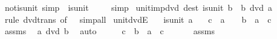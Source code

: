 \begin{isabellebody}
\isamarkupfalse%
\ not{\isacharunderscore}{\kern0pt}is{\isacharunderscore}{\kern0pt}unit{\isacharunderscore}{\kern0pt}{}\ {\isacharbrackleft}{\kern0pt}simp{\isacharbrackright}{\kern0pt}{\isacharcolon}{\kern0pt}\ {\isachardoublequoteopen}{\isasymnot}\ is{\isacharunderscore}{\kern0pt}unit\ {}{\isachardoublequoteclose}\isanewline
%
\isadelimproof
\ \ %
\endisadelimproof
%
\isatagproof
{}\isamarkupfalse%
\ simp%
\endisatagproof
{\isafoldproof}%
%
\isadelimproof
\isanewline
%
\endisadelimproof
\isanewline
{}\isamarkupfalse%
\ unit{\isacharunderscore}{\kern0pt}imp{\isacharunderscore}{\kern0pt}dvd\ {\isacharbrackleft}{\kern0pt}dest{\isacharbrackright}{\kern0pt}{\isacharcolon}{\kern0pt}\ {\isachardoublequoteopen}is{\isacharunderscore}{\kern0pt}unit\ b\ {\isasymLongrightarrow}\ b\ dvd\ a{\isachardoublequoteclose}\isanewline
%
\isadelimproof
\ \ %
\endisadelimproof
%
\isatagproof
{}\isamarkupfalse%
\ {\isacharparenleft}{\kern0pt}rule\ dvd{\isacharunderscore}{\kern0pt}trans\ {\isacharbrackleft}{\kern0pt}of\ {\isacharunderscore}{\kern0pt}\ {}{\isacharbrackright}{\kern0pt}{\isacharparenright}{\kern0pt}\ simp{\isacharunderscore}{\kern0pt}all%
\endisatagproof
{\isafoldproof}%
%
\isadelimproof
\isanewline
%
\endisadelimproof
\isanewline
{}\isamarkupfalse%
\ unit{\isacharunderscore}{\kern0pt}dvdE{\isacharcolon}{\kern0pt}\isanewline
\ \ \ {\isachardoublequoteopen}is{\isacharunderscore}{\kern0pt}unit\ a{\isachardoublequoteclose}\isanewline
\ \ \ c\ \ {\isachardoublequoteopen}a\ {\isasymnoteq}\ {}{\isachardoublequoteclose}\ \ {\isachardoublequoteopen}b\ {\isacharequal}{\kern0pt}\ a\ {\isacharasterisk}{\kern0pt}\ c{\isachardoublequoteclose}\isanewline
%
\isadelimproof
%
\endisadelimproof
%
\isatagproof
{}\isamarkupfalse%
\ {\isacharminus}{\kern0pt}\isanewline
\ \ \isamarkupfalse%
\ assms\ \isamarkupfalse%
\ {\isachardoublequoteopen}a\ dvd\ b{\isachardoublequoteclose}\ \isamarkupfalse%
\ auto\isanewline
\ \ \isamarkupfalse%
\ \isamarkupfalse%
\ c\ \ {\isachardoublequoteopen}b\ {\isacharequal}{\kern0pt}\ a\ {\isacharasterisk}{\kern0pt}\ c{\isachardoublequoteclose}\ \isacommand{{\isachardot}{\kern0pt}{\isachardot}{\kern0pt}}\isamarkupfalse%
\isanewline
\ \ \isamarkupfalse%
\ \isamarkupfalse%
\ assms\ \isamarkupfalse%

\end{isabellebody}
